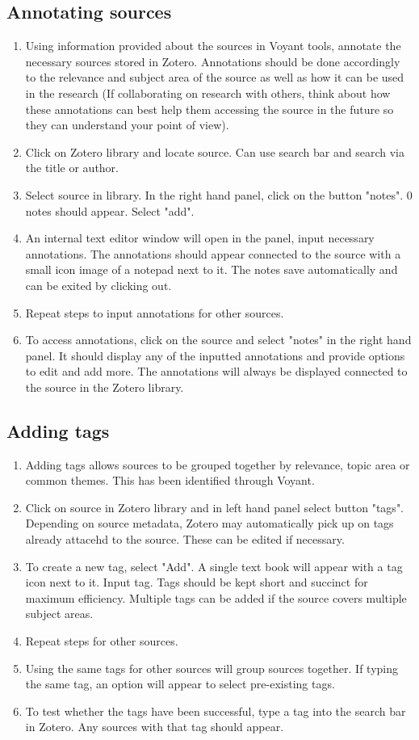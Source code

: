 \documentclass{article}
\begin{document}
\subsection{Annotating sources}
\begin{enumerate}
    \item Using information provided about the sources in Voyant tools, annotate the necessary sources stored in Zotero. Annotations should be done accordingly to the relevance and subject area of the source as well as how it can be used in the research (If collaborating on research with others, think about how these annotations can best help them accessing the source in the future so they can understand your point of view). 
    \item Click on Zotero library and locate source. Can use search bar and search via the title or author.
    \item Select source in library. In the right hand panel, click on the button "notes". 0 notes should appear. Select "add".
    \item An internal text editor window will open in the panel, input necessary annotations. The annotations should appear connected to the source with a small icon image of a notepad next to it. The notes save automatically and can be exited by clicking out.
    \item Repeat steps to input annotations for other sources.
    \item To access annotations, click on the source and select "notes" in the right hand panel. It should display any of the inputted annotations and provide options to edit and add more. The annotations will always be displayed connected to the source in the Zotero library.
\end{enumerate}

\subsection{Adding tags}
\begin{enumerate}
    \item Adding tags allows sources to be grouped together by relevance, topic area or common themes. This has been identified through Voyant.
    \item Click on source in Zotero library and in left hand panel select button "tags". Depending on source metadata, Zotero may automatically pick up on tags already attacehd to the source. These can be edited if necessary.
    \item To create a new tag, select "Add". A single text book will appear with a tag icon next to it. Input tag. Tags should be kept short and succinct for maximum efficiency. Multiple tags can be added if the source covers multiple subject areas.
    \item Repeat steps for other sources. 
    \item Using the same tags for other sources will group sources together. If typing the same tag, an option will appear to select pre-existing tags. 
    \item To test whether the tags have been successful, type a tag into the search bar in Zotero. Any sources with that tag should appear.
\end{enumerate}
\end{document}
